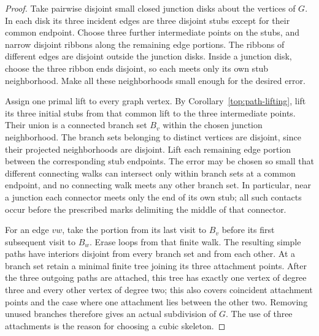 \documentclass[11pt]{article}
\numberwithin{equation}{section}
\theoremstyle{definition}
\theoremstyle{remark}
\newcommand{\1}{\mathbf 1}
\begin{document}
\begin{proof}
Take pairwise disjoint small closed junction disks about the vertices
of $G$.  In each disk its three incident edges are three disjoint stubs
except for their common endpoint.  Choose three further intermediate
points on the stubs, and narrow disjoint ribbons along the remaining
edge portions.  The ribbons of different edges are disjoint outside
the junction disks.  Inside a junction disk, choose the three ribbon
ends disjoint, so each meets only its own stub neighborhood.  Make
all these neighborhoods small enough for the desired error.

Assign one primal lift to every graph vertex.  By
Corollary~\ref{top:path-lifting}, lift its three initial stubs from
that common lift to the three intermediate points.  Their union is a
connected branch set $B_v$ within the chosen junction neighborhood.
The branch sets belonging to distinct vertices are disjoint, since
their projected neighborhoods are disjoint.  Lift each remaining
edge portion between the corresponding stub endpoints.  The error
may be chosen so small that different connecting walks can intersect
only within branch sets at a common endpoint, and no connecting walk
meets any other branch set.  In particular, near a junction each
connector meets only the end of its own stub; all such contacts occur
before the prescribed marks delimiting the middle of that connector.

For an edge $vw$, take the portion from its last visit to $B_v$
before its first subsequent visit to $B_w$.  Erase loops from that
finite walk.  The resulting simple paths have interiors disjoint
from every branch set and from each other.  At a branch set retain
a minimal finite tree joining its three attachment points.  After
the three outgoing paths are attached, this tree has exactly one
vertex of degree three and every other vertex of degree two; this
also covers coincident attachment points and the case where one
attachment lies between the other two.  Removing unused branches
therefore gives an actual subdivision of $G$.  The use of three
attachments is the reason for choosing a cubic skeleton.


\end{proof}
\end{document}
